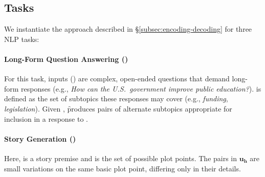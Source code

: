 
\subsection{Tasks}
\label{subsec:tasks}
We instantiate the approach described in \S\ref{subsec:encoding-decoding} for three NLP tasks:

\paragraph{Long-Form Question Answering (\qa)} For this task, inputs (\inp) are complex, open-ended questions that demand long-form responses (e.g., \emph{How can the U.S.\ government improve public education?}). \units is defined as the set of subtopics these responses may cover (e.g., \emph{funding}, \emph{legislation}). Given \inp, \f produces pairs of alternate subtopics appropriate for inclusion in a response to \inp.


\paragraph{Story Generation (\sg)} Here, \inp is a story premise and \units is the set of possible plot points. The pairs in $\mathbf{u}_\mathbf{h}$ are small variations on the same basic plot point, differing only in their details.


